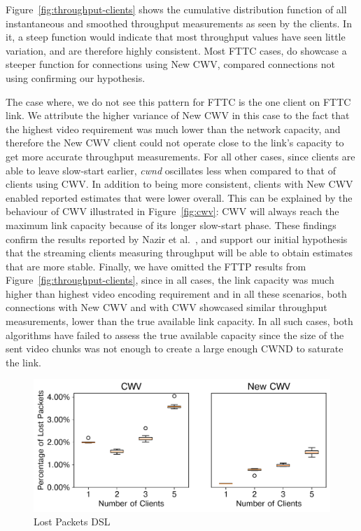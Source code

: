 \documentclass[10pt,sigconf]{acmart}
\begin{document}
Figure~\ref{fig:throughput-clients} shows the cumulative distribution function of all instantaneous and smoothed throughput measurements as seen by the clients. In it, a steep function would indicate that most throughput values have seen little variation, and are therefore highly consistent. Most FTTC cases, do showcase a steeper function for connections using New CWV, compared connections not using confirming our hypothesis. 

The case where, we do not see this pattern for FTTC is the one client on FTTC link. We attribute the higher variance of New CWV in this case to the fact that the highest video requirement was much lower than the network capacity, and therefore the New CWV client could not operate close to the link's capacity to get more accurate throughput measurements. For all other cases, since clients are able to leave slow-start earlier, \emph{cwnd} oscillates less when compared to that of clients using CWV. In addition to being more consistent, clients with New CWV enabled reported estimates that were lower overall. This can be explained by the behaviour of CWV illustrated in Figure~\ref{fig:cwv}: CWV will always reach the maximum link capacity because of its longer slow-start phase. These findings confirm the results reported by Nazir et al.~\cite{Nazir-2014-performance-evaluation-congestion-window-validation-dash-newcwv}, and support our initial hypothesis that the streaming clients measuring throughput will be able to obtain estimates that are more stable. Finally, we have omitted the FTTP results from Figure~\ref{fig:throughput-clients}, since in all cases, the link capacity was much higher than highest video encoding requirement and in all these scenarios, both connections with New CWV and with CWV showcased similar throughput measurements, lower than the true available link capacity. In all such cases, both algorithms have failed to assess the true available capacity since the size of the sent video chunks was not enough to create a large enough CWND to saturate the link.

\begin{figure}[t!]
  \centering
  \includegraphics[width=.45\textwidth]{figures/lost_packets.pdf}
  \caption{Lost Packets DSL}
  \label{fig:lost-packets}
\end{figure}
\end{document}
